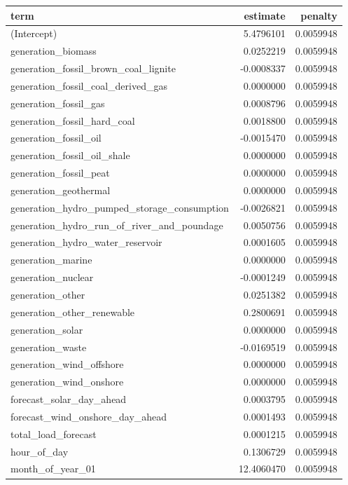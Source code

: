 \documentclass[
]{article}
\begin{document}
\begin{longtable*}[t]{lrr}
\toprule
term & estimate & penalty\\
\midrule
(Intercept) & 5.4796101 & 0.0059948\\
generation\_biomass & 0.0252219 & 0.0059948\\
generation\_fossil\_brown\_coal\_lignite & -0.0008337 & 0.0059948\\
generation\_fossil\_coal\_derived\_gas & 0.0000000 & 0.0059948\\
generation\_fossil\_gas & 0.0008796 & 0.0059948\\
\addlinespace
generation\_fossil\_hard\_coal & 0.0018800 & 0.0059948\\
generation\_fossil\_oil & -0.0015470 & 0.0059948\\
generation\_fossil\_oil\_shale & 0.0000000 & 0.0059948\\
generation\_fossil\_peat & 0.0000000 & 0.0059948\\
generation\_geothermal & 0.0000000 & 0.0059948\\
\addlinespace
generation\_hydro\_pumped\_storage\_consumption & -0.0026821 & 0.0059948\\
generation\_hydro\_run\_of\_river\_and\_poundage & 0.0050756 & 0.0059948\\
generation\_hydro\_water\_reservoir & 0.0001605 & 0.0059948\\
generation\_marine & 0.0000000 & 0.0059948\\
generation\_nuclear & -0.0001249 & 0.0059948\\
\addlinespace
generation\_other & 0.0251382 & 0.0059948\\
generation\_other\_renewable & 0.2800691 & 0.0059948\\
generation\_solar & 0.0000000 & 0.0059948\\
generation\_waste & -0.0169519 & 0.0059948\\
generation\_wind\_offshore & 0.0000000 & 0.0059948\\
\addlinespace
generation\_wind\_onshore & 0.0000000 & 0.0059948\\
forecast\_solar\_day\_ahead & 0.0003795 & 0.0059948\\
forecast\_wind\_onshore\_day\_ahead & 0.0001493 & 0.0059948\\
total\_load\_forecast & 0.0001215 & 0.0059948\\
hour\_of\_day & 0.1306729 & 0.0059948\\
\addlinespace
month\_of\_year\_01 & 12.4060470 & 0.0059948\\

\end{longtable*}
\end{document}
